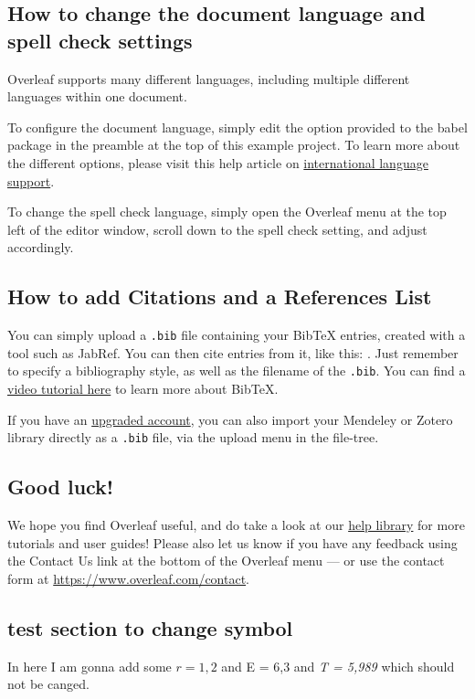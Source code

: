 \documentclass{article}
\begin{document}
\subsection{How to change the document language and spell check settings} 

Overleaf supports many different languages, including multiple different languages within one document. 

To configure the document language, simply edit the option provided to the babel package in the preamble at the top of this example project. To learn more about the different options, please visit this help article on \href{https://www.overleaf.com/learn/latex/International_language_support}{international language support}. 

To change the spell check language, simply open the Overleaf menu at the top left of the editor window, scroll down to the spell check setting, and adjust accordingly. 

\subsection{How to add Citations and a References List} 

You can simply upload a \verb|.bib| file containing your BibTeX entries, created with a tool such as JabRef. You can then cite entries from it, like this: \cite{greenwade93}. Just remember to specify a bibliography style, as well as the filename of the \verb|.bib|. You can find a \href{https://www.overleaf.com/help/97-how-to-include-a-bibliography-using-bibtex}{video tutorial here} to learn more about BibTeX. 

If you have an \href{https://www.overleaf.com/user/subscription/plans}{upgraded account}, you can also import your Mendeley or Zotero library directly as a \verb|.bib| file, via the upload menu in the file-tree. 

\subsection{Good luck!} 

We hope you find Overleaf useful, and do take a look at our \href{https://www.overleaf.com/learn}{help library} for more tutorials and user guides! Please also let us know if you have any feedback using the Contact Us link at the bottom of the Overleaf menu --- or use the contact form at \url{https://www.overleaf.com/contact}. 

\subsection{test section to change symbol} 

In here I am gonna add some $ r = 1,2 $ and E = 6,3 and \textit{T = 5,989 } which should not be canged. 

 
 
\end{document}
